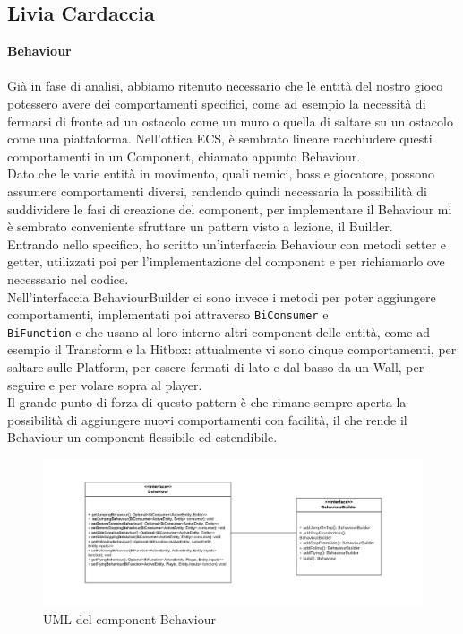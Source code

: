 \documentclass[a4paper,12pt]{report}
\begin{document}
\subsection{Livia Cardaccia}
\textbf{Behaviour}\\
\\
Già in fase di analisi, abbiamo ritenuto necessario che le entità del nostro gioco potessero avere dei comportamenti specifici, come ad esempio la necessità di fermarsi di fronte ad un ostacolo come un muro o quella di saltare su un ostacolo come una piattaforma.
Nell'ottica ECS, è sembrato lineare racchiudere questi comportamenti in un Component, chiamato appunto Behaviour.\\ Dato che le varie entità in movimento, quali nemici, boss e giocatore, possono assumere comportamenti diversi, rendendo quindi necessaria la possibilità di suddividere le fasi di creazione del component, per implementare il Behaviour mi è sembrato conveniente sfruttare un pattern visto a lezione, il Builder.\\ Entrando nello specifico, ho scritto un'interfaccia Behaviour con metodi setter e getter, utilizzati poi per l'implementazione del component e per richiamarlo ove necesssario nel codice.\\
Nell'interfaccia BehaviourBuilder ci sono invece i metodi per poter aggiungere comportamenti, implementati poi attraverso \texttt{BiConsumer} e\\ \texttt{BiFunction} e che usano al loro interno altri component delle entità, come ad esempio il Transform e la Hitbox: attualmente vi sono cinque comportamenti, per saltare sulle Platform, per essere fermati di lato e dal basso da un Wall, per seguire e per volare sopra al player.\\
Il grande punto di forza di questo pattern è che rimane sempre aperta la possibilità di aggiungere nuovi comportamenti con facilità, il che rende il Behaviour un component flessibile ed estendibile.

\begin{figure}[ht]
\includegraphics[width=1\textwidth]{umlBehaviour.png}
\caption{UML del component Behaviour}
\label{fig:schgen}
\end{figure}
\end{document}

